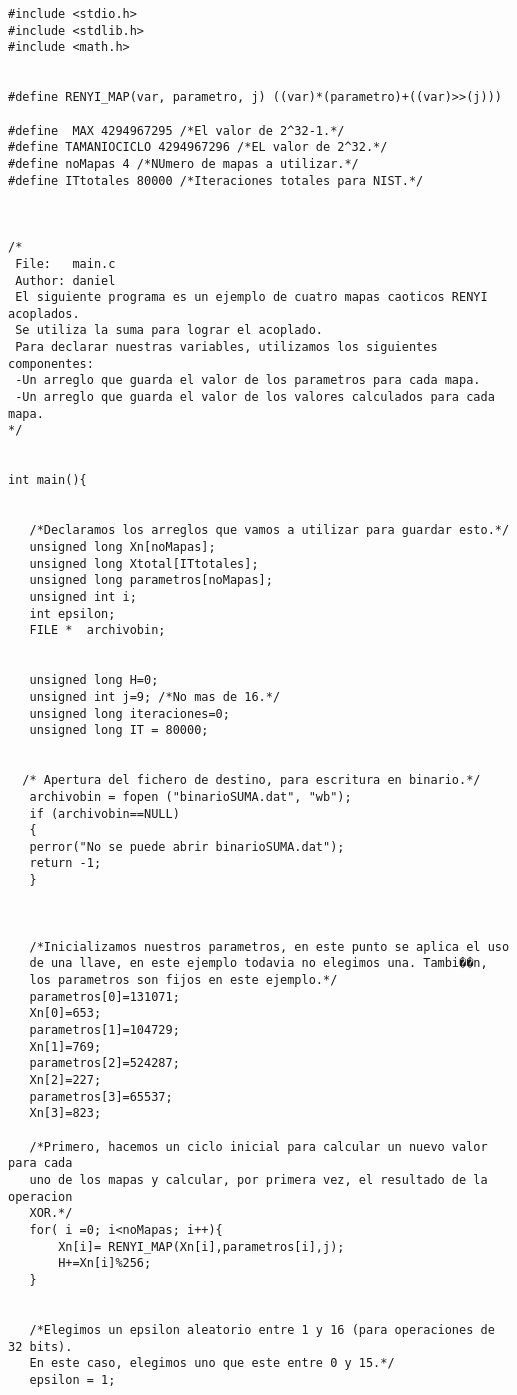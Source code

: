 \documentclass[12pt,3p]{elsarticle}
\begin{document}
\begin{verbatim}
#include <stdio.h>
#include <stdlib.h>
#include <math.h>


#define RENYI_MAP(var, parametro, j) ((var)*(parametro)+((var)>>(j)))

#define  MAX 4294967295 /*El valor de 2^32-1.*/
#define TAMANIOCICLO 4294967296 /*EL valor de 2^32.*/
#define noMapas 4 /*NUmero de mapas a utilizar.*/
#define ITtotales 80000 /*Iteraciones totales para NIST.*/



/*
 File:   main.c
 Author: daniel
 El siguiente programa es un ejemplo de cuatro mapas caoticos RENYI acoplados.
 Se utiliza la suma para lograr el acoplado.
 Para declarar nuestras variables, utilizamos los siguientes componentes:
 -Un arreglo que guarda el valor de los parametros para cada mapa.
 -Un arreglo que guarda el valor de los valores calculados para cada mapa.
*/


int main(){
 
   
   /*Declaramos los arreglos que vamos a utilizar para guardar esto.*/
   unsigned long Xn[noMapas];
   unsigned long Xtotal[ITtotales]; 
   unsigned long parametros[noMapas];
   unsigned int i;
   int epsilon;
   FILE *  archivobin; 
   

   unsigned long H=0; 
   unsigned int j=9; /*No mas de 16.*/
   unsigned long iteraciones=0;
   unsigned long IT = 80000;


  /* Apertura del fichero de destino, para escritura en binario.*/
   archivobin = fopen ("binarioSUMA.dat", "wb");
   if (archivobin==NULL)
   {
   perror("No se puede abrir binarioSUMA.dat");
   return -1;
   }
   


   /*Inicializamos nuestros parametros, en este punto se aplica el uso
   de una llave, en este ejemplo todavia no elegimos una. Tambi��n,
   los parametros son fijos en este ejemplo.*/
   parametros[0]=131071;
   Xn[0]=653;
   parametros[1]=104729;
   Xn[1]=769;
   parametros[2]=524287;
   Xn[2]=227;
   parametros[3]=65537;
   Xn[3]=823;
                   
   /*Primero, hacemos un ciclo inicial para calcular un nuevo valor para cada
   uno de los mapas y calcular, por primera vez, el resultado de la operacion
   XOR.*/
   for( i =0; i<noMapas; i++){
       Xn[i]= RENYI_MAP(Xn[i],parametros[i],j);
       H+=Xn[i]%256;
   }
   
 
   /*Elegimos un epsilon aleatorio entre 1 y 16 (para operaciones de 32 bits).
   En este caso, elegimos uno que este entre 0 y 15.*/
   epsilon = 1;   
  

\end{verbatim}
\end{document}
